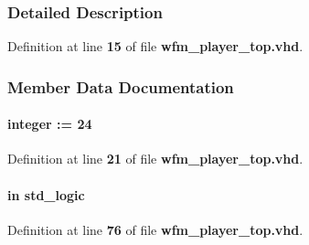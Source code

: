 \subsubsection{Detailed Description}


Definition at line {\bf 15} of file {\bf wfm\+\_\+player\+\_\+top.\+vhd}.



\subsubsection{Member Data Documentation}
\paragraph[{addr\+\_\+size}]{ {\bfseries \textcolor{vhdlchar}{ }} {\bfseries \textcolor{comment}{integer}\textcolor{vhdlchar}{ }\textcolor{vhdlchar}{ }\textcolor{vhdlchar}{\+:}\textcolor{vhdlchar}{=}\textcolor{vhdlchar}{ }\textcolor{vhdlchar}{ } \textcolor{vhdldigit}{24} \textcolor{vhdlchar}{ }} \hspace{0.3cm}{\ttfamily [Generic]}}\label{classwfm__player__top_aafb0d946e5259c516e95eed0224fc8e6}


Definition at line {\bf 21} of file {\bf wfm\+\_\+player\+\_\+top.\+vhd}.

\paragraph[{begin\+\_\+test}]{ {\bfseries \textcolor{keywordflow}{in}\textcolor{vhdlchar}{ }} {\bfseries \textcolor{comment}{std\+\_\+logic}\textcolor{vhdlchar}{ }} \hspace{0.3cm}{\ttfamily [Port]}}\label{classwfm__player__top_a9762949045cae07c0a98ab427ba77ccb}


Definition at line {\bf 76} of file {\bf wfm\+\_\+player\+\_\+top.\+vhd}.

